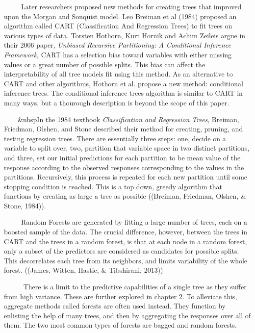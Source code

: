 \documentclass[12pt,twoside]{reedthesis}
\begin{document}
  ~~~~~Later researchers proposed new methods for creating trees that
  improved upon the Morgan and Sonquist model. Leo Breiman et al (1984)
  proposed an algorithm called CART (Classification And Regression Trees)
  to fit trees on various types of data. Torsten Hothorn, Kurt Hornik and
  Achim Zeileis argue in their 2006 paper, \emph{Unbiased Recursive
  Partitioning: A Conditional Inference Framework}, CART has a selection
  bias toward variables with either missing values or a great number of
  possible splits. This bias can affect the interpretability of all tree
  models fit using this method. As an alternative to CART and other
  algorithms, Hothorn et al. propose a new method: conditional inference
  trees. The conditional inference trees algorithm is similar to CART in
  many ways, but a thourough description is beyond the scope of this
  paper.
  
  ~~~~\&nbspIn the 1984 textbook \emph{Classification and Regression
  Trees}, Breiman, Friedman, Olshen, and Stone described their method for
  creating, pruning, and testing regression trees. There are essentially
  three steps: one, decide on a variable to split over, two, partition
  that variable space in two distinct partitions, and three, set our
  initial predictions for each partition to be mean value of the response
  according to the observed responses corresponding to the values in the
  partitions. Recursively, this process is repeated for each new partition
  until some stopping condition is reached. This is a top down, greedy
  algorithm that functions by creating as large a tree as possible
  ((Breiman, Friedman, Olshen, \& Stone, 1984)).
  
  ~~~~~Random Forests are generated by fitting a large number of trees,
  each on a boosted sample of the data. The crucial difference, however,
  between the trees in CART and the trees in a random forest, is that at
  each node in a random forest, only a subset of the predictors are
  considered as candidates for possible splits. This decorrelates each
  tree from its neighbors, and limits variability of the whole forest.
  ((James, Witten, Hastie, \& Tibshirani, 2013))
  
  ~~~~~ There is a limit to the predictive capabilities of a single tree
  as they suffer from high variance. These are further explored in chapter
  2. To alleviate this, aggregate methods called forests are often used
  instead. They function by enlisting the help of many trees, and then by
  aggregating the responses over all of them. The two most common types of
  forests are bagged and random forests.
  
\end{document}
